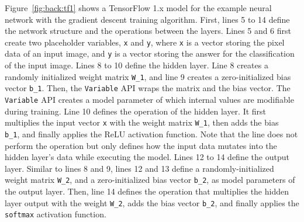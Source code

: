 % 

Figure~\ref{fig:back:tf1} shows a TensorFlow 1.x model for the example neural
network with the gradient descent training algorithm.
First, lines 5 to 14 define the network structure and the operations
between the layers.
Lines 5 and 6 first create two placeholder variables, {\tt x} and {\tt y},
where {\tt x} is a vector storing the pixel data of an input image, and {\tt y}
is a vector storing the answer for the classification of the input image. 
Lines 8 to 10 define the hidden layer.
Line 8 creates a randomly initialized weight matrix {\tt W\_1}, and line 9
creates a zero-initialized bias vector {\tt b\_1}.
Then, the {\tt Variable} API wraps the matrix and the bias vector.
The {\tt Variable} API creates a model parameter of which internal values are
modifiable during training.
Line 10 defines the operation of the hidden layer. It first multiplies the
input vector {\tt x} with the weight matrix {\tt W\_1}, then adds the bias {\tt
b\_1}, and finally applies the ReLU activation function. 
Note that the line does not perform the operation but only defines how
the input data mutates into the hidden layer's data while executing the
model.
Lines 12 to 14 define the output layer.
Similar to lines 8 and 9, lines 12 and 13 define a randomly-initialized
weight matrix {\tt W\_2}, and a zero-initialized bias vector {\tt b\_2}, as
model parameters of the output layer.
Then, line 14 defines the operation that
multiplies the hidden layer output with
the weight {\tt W\_2}, adds the bias vector {\tt b\_2}, and finally applies the
{\tt softmax} activation function.





